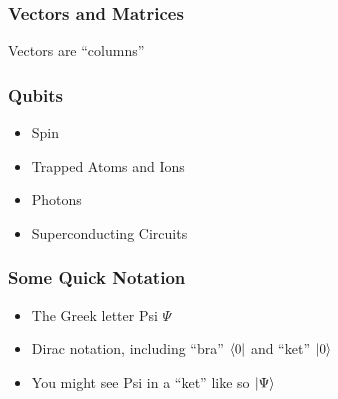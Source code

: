 \documentclass[aspectratio=169]{beamer} %
\begin{document}
\begin{frame}
	\frametitle{Vectors and Matrices}
    Vectors are ``columns''
\end{frame}

%
\begin{frame}
    \frametitle{Qubits}
    \begin{itemize}
    \item Spin
    \item Trapped Atoms and Ions
    \item Photons
    \item Superconducting Circuits\
	\end{itemize}

\end{frame}

\begin{frame}
	\frametitle{Some Quick Notation}
    \begin{itemize}
	\item The Greek letter Psi \begin{math}\Psi\end{math}
    \item Dirac notation, including ``bra'' \begin{math}\bra{0}\end{math} and ``ket'' \begin{math}\ket{0}\end{math}
	\item You might see Psi in a ``ket'' like so \begin{math}\ket{\Psi}\end{math}
    \end{itemize}

\end{frame}

\end{document}
